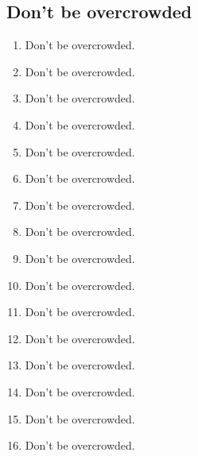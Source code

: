 \documentclass[
        handout,
        ]{beamer}
\begin{document}
\subsection{Don't be overcrowded}
\begin{frame}[t]{\subsecname} %
    \begin{enumerate}
    \item Don't be overcrowded.
    \item Don't be overcrowded.
    \item Don't be overcrowded.
    \item Don't be overcrowded.
    \item Don't be overcrowded.

    \item Don't be overcrowded.
    \item Don't be overcrowded.
    \item Don't be overcrowded.
    \item Don't be overcrowded.
    \item Don't be overcrowded.
    
    \item Don't be overcrowded.
    \item Don't be overcrowded.
    \item Don't be overcrowded.
    \item Don't be overcrowded.
    \item Don't be overcrowded.
    
    \item Don't be overcrowded.
    \end{enumerate}
\end{frame}
\end{document}
